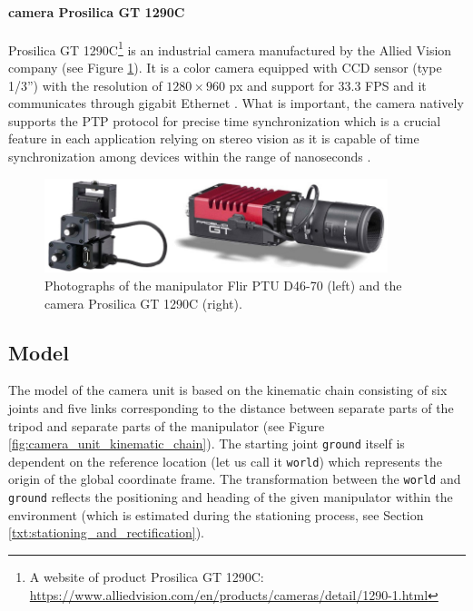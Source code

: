 \paragraph{camera Prosilica GT 1290C} Prosilica GT 1290C\footnote{A website of product Prosilica GT 1290C: \url{https://www.alliedvision.com/en/products/cameras/detail/1290-1.html}} is an industrial camera manufactured by the Allied Vision company (see Figure \ref{fig:prosilica_gt1290c_flir_ptud4670}). It is a color camera equipped with CCD sensor (type 1/3'') with the resolution of $1280 \times 960$ px and support for $33.3$ FPS and it communicates through gigabit Ethernet \cite{Prosilica_gt1290c}. What is important, the camera natively supports the PTP protocol for precise time synchronization which is a crucial feature in each application relying on stereo vision as it is capable of time synchronization among devices within the range of nanoseconds \cite{PTP}.

\begin{figure}[htb]
	\centering
	\includegraphics[width=10cm]{fig/prosilica_gt1290c_flir_ptud4670.jpg}
	\caption{Photographs of the manipulator Flir PTU D46-70 (left) and the camera Prosilica GT 1290C (right).}
	\label{fig:prosilica_gt1290c_flir_ptud4670}
\end{figure}

\subsection{Model} \label{txt:model}

The model of the camera unit is based on the kinematic chain consisting of six joints and five links corresponding to the distance between separate parts of the tripod and separate parts of the manipulator (see Figure \ref{fig:camera_unit_kinematic_chain}). The starting joint \texttt{ground} itself is dependent on the reference location (let us call it \texttt{world}) which represents the origin of the global coordinate frame. The transformation between the \texttt{world} and \texttt{ground} reflects the positioning and heading of the given manipulator within the environment (which is estimated during the stationing process, see Section \ref{txt:stationing_and_rectification}).

